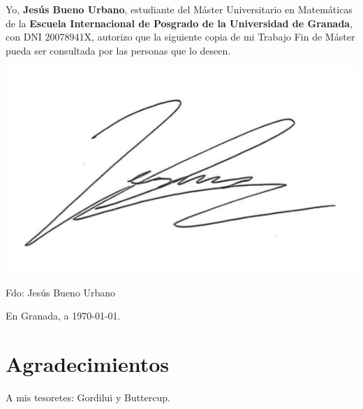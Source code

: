 Yo, \textbf{Jesús Bueno Urbano}, estudiante del Máster Universitario en Matemáticas de la \textbf{Escuela Internacional de Posgrado de la Universidad de Granada}, con DNI 20078941X, autorizo que la siguiente copia de mi Trabajo Fin de Máster pueda ser consultada por las personas que lo deseen.

\vspace{2cm}

\includegraphics[scale=0.3]{images/firma.png}

\vspace{1cm}

\noindent Fdo: Jesús Bueno Urbano

\vspace{2cm}

\begin{flushright}
En Granada, a \today.
\end{flushright}


\chapter*{Agradecimientos}
\thispagestyle{empty}

       \vspace{1cm}


A mis tesoretes: Gordilui y Buttercup.
